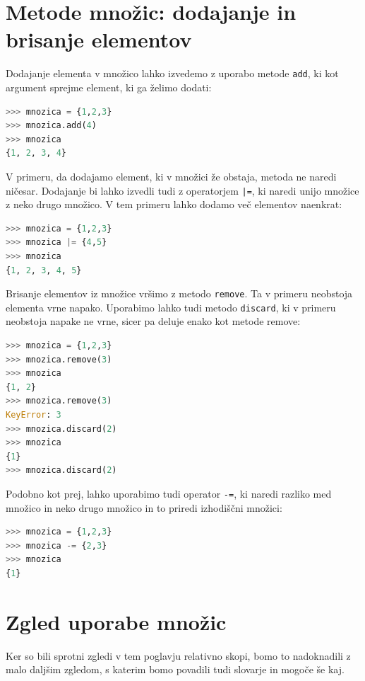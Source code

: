 \section{Metode množic: dodajanje in brisanje elementov}
Dodajanje elementa v množico lahko izvedemo z uporabo metode \texttt{add}, ki kot argument sprejme element, ki ga želimo dodati:
\begin{lstlisting}[language=Python, showstringspaces=false]
>>> mnozica = {1,2,3}
>>> mnozica.add(4)
>>> mnozica
{1, 2, 3, 4}
\end{lstlisting}
V primeru, da dodajamo element, ki v množici že obstaja, metoda ne naredi ničesar. Dodajanje bi lahko izvedli tudi z operatorjem \texttt{|=}, ki naredi unijo množice z neko drugo množico. V tem primeru lahko dodamo več elementov naenkrat:
\begin{lstlisting}[language=Python, showstringspaces=false]
>>> mnozica = {1,2,3}
>>> mnozica |= {4,5}
>>> mnozica
{1, 2, 3, 4, 5}
\end{lstlisting}

Brisanje elementov iz množice vršimo z metodo \texttt{remove}. Ta v primeru neobstoja elementa vrne napako. Uporabimo lahko tudi metodo \texttt{discard}, ki v primeru neobstoja napake ne vrne, sicer pa deluje enako kot metode remove:
\begin{lstlisting}[language=Python, showstringspaces=false]
>>> mnozica = {1,2,3}
>>> mnozica.remove(3)
>>> mnozica
{1, 2}
>>> mnozica.remove(3)
KeyError: 3
>>> mnozica.discard(2)
>>> mnozica
{1}
>>> mnozica.discard(2)
\end{lstlisting}
Podobno kot prej, lahko uporabimo tudi operator \texttt{-=}, ki naredi razliko med množico in neko drugo množico in to priredi izhodiščni množici:
\begin{lstlisting}[language=Python, showstringspaces=false]
>>> mnozica = {1,2,3}
>>> mnozica -= {2,3}
>>> mnozica
{1}
\end{lstlisting}

\section{Zgled uporabe množic}
Ker so bili sprotni zgledi v tem poglavju relativno skopi, bomo to nadoknadili z malo daljšim zgledom, s katerim bomo povadili tudi slovarje in mogoče še kaj. 

